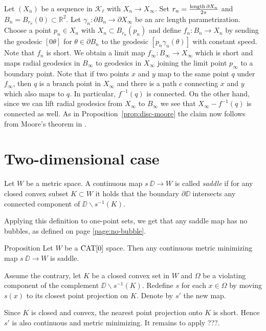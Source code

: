 \documentclass{article}
\begin{document}
Let $(X_n)$ be a sequence in $\mathcal{K}_\ell$ with $X_n\to X_\infty$. 
Set $r_n=\frac{\mathop{\rm length}\nolimits\partial X_n}{2\pi}$ 
and $B_n=B_{r_n}(0)\subset \mathbb{R}^2$.
Let $\gamma_n:\partial B_n\to\partial X_\infty$ be an arc length parametrization.
Choose a point $p_n\in X_n$ with $X_n\subset B_{r_n}(p_n)$ and define
$f_n:B_n\to X_n$ by sending the geodesic $[0\theta]$ for $\theta\in\partial B_n$ to the geodesic $[p_n\gamma_n(\theta)]$ with constant speed. 
Note that $f_n$ is short.
We obtain a limit map $f_\infty:B_\infty\to X_\infty$ which is short and maps radial geodesics in $B_\infty$ to geodesics in $X_\infty$ joining the limit point $p_\infty$
to a boundary point.
Note that if two points $x$  and $y$ map to the same point $q$ under $f_\infty$, then $q$ is a branch point in $X_\infty$ and there is a path $c$ connecting 
$x$ and $y$ which also maps to $q$. 
In particular, $f^{-1}(q)$ is connected.
On the other hand, since we can lift radial geodesics from $X_\infty$ to $B_\infty$ we see that $X_\infty-f^{-1}(q)$
is connected as well.
As in Proposition~\ref{prop:disc-moore} the claim now follows from Moore's theorem in \cite{moore}.
\qeds


\section{Two-dimensional case}\label{Shefel}

Let $W$ be a metric space.
A continuous map $s\:\DD\to W$ is called \emph{saddle} if for any closed convex subset $K\subset W$ it holds that
the boundary $\partial \DD$ intersects
any connected component of $\DD\backslash s^{-1}(K)$.

Applying this definition to one-point sets,
we get that any saddle map has no bubbles, 
as defined on page \ref{page:no-bubble}.


\begin{thm}{Proposition}\label{prop:memisaddle}
Let $W$ be a $\mathop{\rm CAT}\nolimits[0]$ space.
Then any continuous metric minimizing map $s\:\DD\to W$ is saddle.
\end{thm}

Assume the contrary, let $K$ be a closed convex set in $W$
and $\Omega$ be a violating component of the complement $\DD\backslash s^{-1}(K)$. 
Redefine $s$ for each $x\in\Omega$ by moving 
$s(x)$ to its closest point projection on $K$.
Denote by $s'$ the new map. 

Since $K$ is closed and convex, the nearest point projection onto $K$ is short.
Hence $s'$ is also continuous and metric minimizing. 
It remains to apply ???.
\qeds
\end{document}
